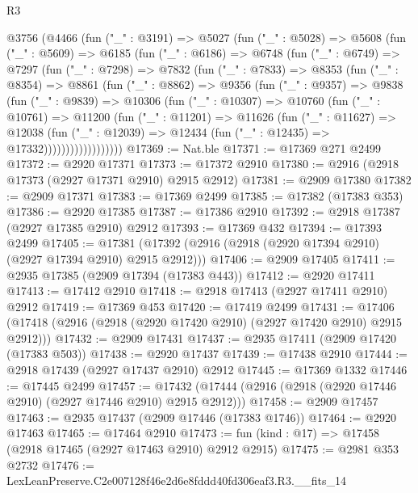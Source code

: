 \begin{lexlean}{R3}
\begin{coremodule}
  @3756
    (@4466
      (fun ("_" : @3191) =>
      @5027
        (fun ("_" : @5028) =>
        @5608
          (fun ("_" : @5609) =>
          @6185
            (fun ("_" : @6186) =>
            @6748
              (fun ("_" : @6749) =>
              @7297
                (fun ("_" : @7298) =>
                @7832
                  (fun ("_" : @7833) =>
                  @8353
                    (fun ("_" : @8354) =>
                    @8861
                      (fun ("_" : @8862) =>
                      @9356
                        (fun ("_" : @9357) =>
                        @9838
                          (fun ("_" : @9839) =>
                          @10306
                            (fun ("_" : @10307) =>
                            @10760
                              (fun ("_" : @10761) =>
                              @11200
                                (fun ("_" : @11201) =>
                                @11626
                                  (fun ("_" : @11627) =>
                                  @12038
                                    (fun ("_" : @12039) =>
                                    @12434 (fun ("_" : @12435) => @17332))))))))))))))))))
@17369 := Nat.ble
@17371 := @17369 @271 @2499
@17372 := @2920 @17371
@17373 := @17372 @2910
@17380 := @2916 (@2918 @17373 (@2927 @17371 @2910) @2915 @2912)
@17381 := @2909 @17380
@17382 := @2909 @17371
@17383 := @17369 @2499
@17385 := @17382 (@17383 @353)
@17386 := @2920 @17385
@17387 := @17386 @2910
@17392 := @2918 @17387 (@2927 @17385 @2910) @2912
@17393 := @17369 @432
@17394 := @17393 @2499
@17405 := @17381 (@17392 (@2916 (@2918 (@2920 @17394 @2910) (@2927 @17394 @2910) @2915 @2912)))
@17406 := @2909 @17405
@17411 := @2935 @17385 (@2909 @17394 (@17383 @443))
@17412 := @2920 @17411
@17413 := @17412 @2910
@17418 := @2918 @17413 (@2927 @17411 @2910) @2912
@17419 := @17369 @453
@17420 := @17419 @2499
@17431 := @17406 (@17418 (@2916 (@2918 (@2920 @17420 @2910) (@2927 @17420 @2910) @2915 @2912)))
@17432 := @2909 @17431
@17437 := @2935 @17411 (@2909 @17420 (@17383 @503))
@17438 := @2920 @17437
@17439 := @17438 @2910
@17444 := @2918 @17439 (@2927 @17437 @2910) @2912
@17445 := @17369 @1332
@17446 := @17445 @2499
@17457 := @17432 (@17444 (@2916 (@2918 (@2920 @17446 @2910) (@2927 @17446 @2910) @2915 @2912)))
@17458 := @2909 @17457
@17463 := @2935 @17437 (@2909 @17446 (@17383 @1746))
@17464 := @2920 @17463
@17465 := @17464 @2910
@17473 := fun (kind : @17) => @17458 (@2918 @17465 (@2927 @17463 @2910) @2912 @2915)
@17475 := @2981 @353 @2732
@17476 := LexLeanPreserve.C2e007128f46e2d6e8fddd40fd306eaf3.R3.__fits_14

\end{coremodule}
\end{lexlean}

